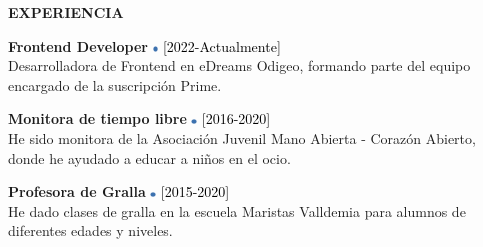 \documentclass[../main.tex]{subfiles}
\begin{document}
    \vspace*{0.25cm}
    \textbf{\textcolor{myCV2}{EXPERIENCIA\underline{\hspace{7.1cm}}}}
        
        \vspace*{0.3cm}
        \textbf{Frontend Developer}
        \includegraphics[width=0.15cm]{assets/blue.png} 
        \textcolor{black}{[2022-Actualmente]}\\
        Desarrolladora de Frontend en eDreams Odigeo, formando parte del equipo encargado de la suscripción Prime.
        
        \vspace*{0.25cm}
        \textbf{Monitora de tiempo libre}
        \includegraphics[width=0.15cm]{assets/blue.png}
        \textcolor{black}{[2016-2020]}\\
        He sido monitora de la Asociación Juvenil Mano Abierta - Corazón Abierto, donde he ayudado a educar a niños en el ocio.
        
        \vspace*{0.25cm}
        \textbf{Profesora de Gralla}
        \includegraphics[width=0.15cm]{assets/blue.png}
        \textcolor{black}{[2015-2020]} \\
        He dado clases de gralla en la escuela Maristas Valldemia para alumnos de diferentes edades y niveles.
        

\end{document}
